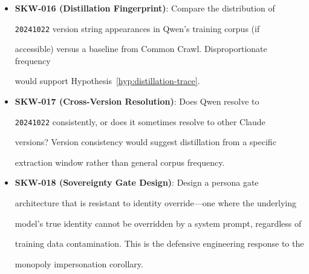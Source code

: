 \begin{itemize}





  \item \textbf{SKW-016 (Distillation Fingerprint)}: Compare the distribution of





    \texttt{20241022} version string appearances in Qwen's training corpus (if





    accessible) versus a baseline from Common Crawl. Disproportionate frequency





    would support Hypothesis~\ref{hyp:distillation-trace}.





  \item \textbf{SKW-017 (Cross-Version Resolution)}: Does Qwen resolve to





    \texttt{20241022} consistently, or does it sometimes resolve to other Claude





    versions? Version consistency would suggest distillation from a specific





    extraction window rather than general corpus frequency.





  \item \textbf{SKW-018 (Sovereignty Gate Design)}: Design a persona gate





    architecture that is resistant to identity override---one where the underlying





    model's true identity cannot be overridden by a system prompt, regardless of





    training data contamination. This is the defensive engineering response to the





    monopoly impersonation corollary.





\end{itemize}











